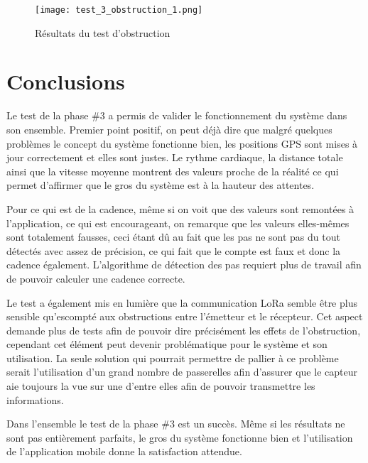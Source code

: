 \begin{figure}[htb]
\centering 
\texttt{[image: test\_3\_obstruction\_1.png]} 
\caption{Résultats du test d'obstruction}
\label{fig:test_3_obstru}
\end{figure}

\section{Conclusions}

Le test de la phase \#3 a permis de valider le fonctionnement du système dans son ensemble. Premier point positif, on peut déjà dire que malgré quelques problèmes le concept du système fonctionne bien, les positions GPS sont mises à jour correctement et elles sont justes. Le rythme cardiaque, la distance totale ainsi que la vitesse moyenne montrent des valeurs proche de la réalité ce qui permet d'affirmer que le gros du système est à la hauteur des attentes.

Pour ce qui est de la cadence, même si on voit que des valeurs sont remontées à l'application, ce qui est encourageant, on remarque que les valeurs elles-mêmes sont totalement fausses, ceci étant dû au fait que les pas ne sont pas du tout détectés avec assez de précision, ce qui fait que le compte est faux et donc la cadence également. L'algorithme de détection des pas requiert plus de travail afin de pouvoir calculer une cadence correcte.

Le test a également mis en lumière que la communication LoRa semble être plus sensible qu'escompté aux obstructions entre l'émetteur et le récepteur. Cet aspect demande plus de tests afin de pouvoir dire précisément les effets de l'obstruction, cependant cet élément peut devenir problématique pour le système et son utilisation. La seule solution qui pourrait permettre de pallier à ce problème serait l'utilisation d'un grand nombre de passerelles afin d'assurer que le capteur aie toujours la vue sur une d'entre elles afin de pouvoir transmettre les informations.

Dans l'ensemble le test de la phase \#3 est un succès. Même si les résultats ne sont pas entièrement parfaits, le gros du système fonctionne bien et l'utilisation de l'application mobile donne la satisfaction attendue.